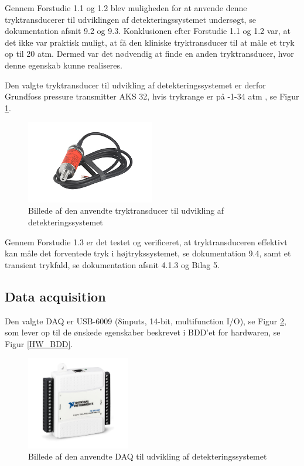 Gennem Forstudie 1.1 og 1.2 blev muligheden for at anvende denne tryktransducerer til udviklingen af detekteringssystemet undersøgt, se dokumentation afsnit 9.2 og 9.3. Konklusionen efter Forstudie 1.1 og 1.2 var, at det ikke var praktisk muligt, at få den kliniske tryktransducer til at måle et tryk op til 20 atm. Dermed var det nødvendig at finde en anden tryktransducer, hvor denne egenskab kunne realiseres. 

Den valgte tryktransducer til udvikling af detekteringssystemet er derfor Grundfoss pressure transmitter AKS 32, hvis trykrange er på -1-34 atm \cite{DatabladAKS32}, se Figur \ref{tryktransducer_valgt}.

\begin{figure}[H]
	\centering
	\includegraphics[width=0.5\textwidth]{Figure/valgttryk}
	\caption{Billede af den anvendte tryktransducer til udvikling af detekteringssystemet}
    \label{tryktransducer_valgt}
\end{figure} 

Gennem Forstudie 1.3 er det testet og verificeret, at tryktransduceren effektivt kan måle det forventede tryk i højtrykssystemet, se dokumentation 9.4, samt et transient trykfald, se dokumentation afsnit 4.1.3 og Bilag 5.  

\subsection{Data acquisition}
Den valgte DAQ er USB-6009 (8inputs, 14-bit, multifunction I/O), se Figur \ref{DAQ}, som lever op til de ønskede egenskaber beskrevet i BDD'et for hardwaren, se Figur \ref{HW_BDD}. 

\begin{figure}[H]
	\centering
	\includegraphics[width=0.4\textwidth]{Figure/DAQ}
	\caption{Billede af den anvendte DAQ til udvikling af detekteringssystemet}
    \label{DAQ}
\end{figure}
 
